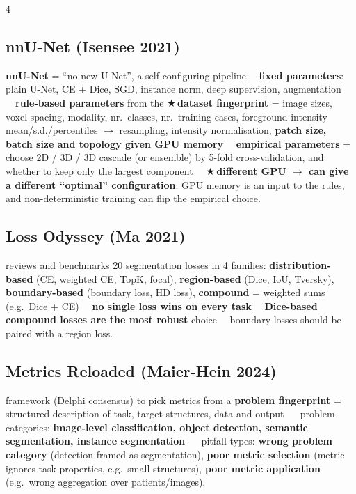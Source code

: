 \documentclass[a4paper]{article}
\renewcommand{\section}[1]{\par\vspace{2.5pt}\noindent{\setlength{\fboxsep}{1pt}\colorbox{black}{\parbox{\dimexpr\linewidth-2\fboxsep}{\color{white}\bfseries\strut#1}}}\par\vspace{1pt}}
\newcommand{\K}[1]{\textcolor{kg}{\textbf{#1}}}
\newcommand{\E}[1]{\textcolor{ep}{#1}}
\newcommand{\T}[1]{\textcolor{tr}{\textbf{#1}}}
\newcommand{\X}{\textcolor{tr}{$\bigstar$}\,}
\newcommand{\D}{\unskip\ \textbf{\textbullet}\ \ignorespaces}
\newcommand{\ra}{\ensuremath{\to}}
\begin{document}
\begin{multicols*}{4}
\section{Course papers}
\subsection{nnU-Net (Isensee 2021)}
\K{nnU-Net} = ``no new U-Net'', a self-configuring pipeline \D \K{fixed parameters}: plain U-Net, CE + Dice, SGD, instance norm, deep supervision, augmentation \D \K{rule-based parameters} from the \X\K{dataset fingerprint} = image sizes, voxel spacing, modality, nr.\ classes, nr.\ training cases, foreground intensity mean/s.d./percentiles \ra{} resampling, intensity normalisation, \K{patch size, batch size and topology given GPU memory} \D \K{empirical parameters} = choose 2D / 3D / 3D cascade (or ensemble) by 5-fold cross-validation, and whether to keep only the largest component \D \X\T{different GPU \ra{} can give a different ``optimal'' configuration}: GPU memory is an input to the rules, and non-deterministic training can flip the empirical choice.

\subsection{Loss Odyssey (Ma 2021)}
reviews and benchmarks 20 segmentation losses in 4 families: \K{distribution-based} (CE, weighted CE, TopK, focal), \K{region-based} (Dice, IoU, Tversky), \K{boundary-based} (boundary loss, HD loss), \K{compound} = weighted sums (e.g.\ Dice + CE) \D \T{no single loss wins on every task} \D \K{Dice-based compound losses are the most robust} choice \D boundary losses should be paired with a region loss.

\subsection{Metrics Reloaded (Maier-Hein 2024)}
framework (Delphi consensus) to pick metrics from a \K{problem fingerprint} = structured description of task, target structures, data and output \D 4 problem categories: \K{image-level classification, object detection, semantic segmentation, instance segmentation} \D 3 pitfall types: \K{wrong problem category} (\E{detection framed as segmentation}), \K{poor metric selection} (metric ignores task properties, e.g.\ small structures), \K{poor metric application} (e.g.\ wrong aggregation over patients/images).


\end{multicols*}
\end{document}
